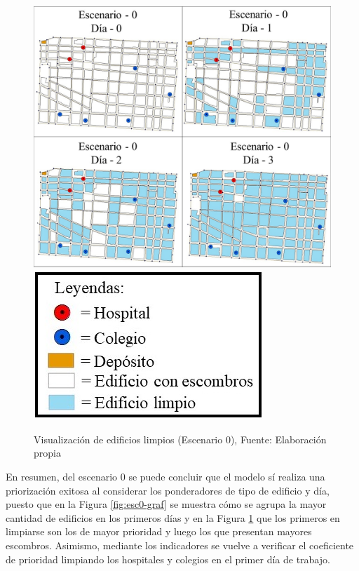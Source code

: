 \documentclass[letterpaper,conference]{IEEEtran}
\begin{document}

\begin{figure}[h!]
\centering
\includegraphics[scale=0.25]{Figuras/visu1.jpg}
\includegraphics[scale=0.45]{Figuras/simb2.jpg} 
\caption{Visualización de edificios limpios  (Escenario 0), Fuente: Elaboración propia}
\label{fig:esc0-visu}
\end{figure}


En resumen, del escenario 0 se puede concluir que el modelo sí realiza una priorización exitosa al considerar los ponderadores de tipo de edificio y día, puesto que en la Figura \ref{fig:esc0-graf} se muestra cómo se agrupa la mayor cantidad de edificios en los primeros días y en la Figura \ref{fig:esc0-visu} que los primeros en limpiarse son los de mayor prioridad y luego los que presentan mayores escombros. Asimismo, mediante los indicadores se vuelve a verificar el coeficiente de prioridad limpiando los hospitales y colegios en el primer día de trabajo.
\end{document}

